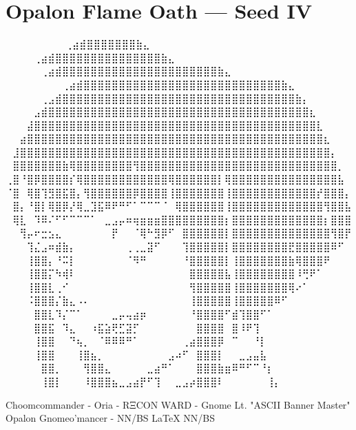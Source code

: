 \section*{Opalon Flame Oath — Seed IV}
\begin{center}
\end{center}


⠀⠀⠀⠀⠀⠀             ⠀⠀⢀⣴⣾⣿⣿⣿⣿⣿⣿⣿⣷⣄⠀⠀⠀⠀⠀⠀⠀⠀
⠀⠀⠀  ⠀      ⠀⠀⠀⠀⢀⣴⣾⣿⣿⣿⣿⣿⣿⣿⣿⣿⣿⣿⣿⣿⣿⣿⣷⣄⠀⠀⠀⠀⠀⠀⠀⠀
⠀⠀ ⠀   ⠀⠀⠀⠀⠀⢀⣴⣾⣿⣿⣿⣿⣿⣿⣿⣿⣿⣿⣿⣿⣿⣿⣿⣿⣿⣿⣿⣿⣿⣿⣷⣄⠀⠀⠀⠀⠀⠀⠀⠀
⠀⠀⠀⠀⠀⠀⠀⠀⢀⣴⣾⣿⣿⣿⣿⣿⣿⣿⣿⣿⣿⣿⣿⣿⣿⣿⣿⣿⣿⣿⣿⣿⣿⣿⣿⣿⣿⣿⣿⣷⣄⠀⠀⠀⠀⠀⠀⠀⠀
⠀⠀⠀⠀⠀⢀⣠⣾⣿⣿⣿⣿⣿⣿⣿⣿⣿⣿⣿⣿⣿⣿⣿⣿⣿⣿⣿⣿⣿⣿⣿⣿⣿⣿⣿⣿⣿⣿⣿⣿⣿⣷⡄⠀⠀⠀⠀⠀⠀
⠀⠀⠀⠀⣠⣾⣿⣿⣿⣿⣿⣿⣿⣿⣿⣿⣿⣿⣿⣿⣿⣿⣿⣿⣿⣿⣿⣿⣿⣿⣿⣿⣿⣿⣿⣿⣿⣿⣿⣿⣿⣿⣿⣆⠀⠀⠀⠀⠀
⠀⠀⠀⣼⣿⣿⣿⣿⣿⣿⣿⣿⣿⣿⣿⣿⣿⣿⣿⣿⣿⣿⣿⣿⣿⣿⣿⣿⣿⣿⣿⣿⣿⣿⣿⣿⣿⣿⣿⣿⣿⣿⣿⣿⣇⠀⠀⠀⠀
⠀⠀⣴⣿⣿⣿⣿⣿⣿⣿⣿⣿⣿⣿⣿⣿⣿⣿⣿⣿⣿⣿⣿⣿⣿⣿⣿⣿⣿⣿⣿⣿⣿⣿⣿⣿⣿⣿⣿⣿⣿⣿⣿⣿⣿⣆⠀⠀⠀
⠀⣸⣿⣿⣿⣿⣿⣿⣿⣿⣿⣿⣿⣿⣿⣿⣿⣿⣿⣿⣿⣿⣿⣿⣿⣿⣿⣿⣿⣿⣿⣿⣿⣿⣿⣿⣿⣿⣿⣿⣿⣿⣿⣿⣿⣿⡄⠀⠀
⠀⣿⣿⣿⣿⣿⣿⣿⣷⢿⣿⣿⣿⣿⣿⣿⣿⣿⢻⣿⣿⣿⣿⣿⣿⣿⣿⣿⣿⣿⣿⣿⣿⣿⣿⣿⣿⣿⣿⣿⣿⣿⣿⣿⣿⣿⣿⡀⠀
⢀⣿⠘⣿⡿⣿⣿⣿⣿⡎⢿⣿⣿⣿⣿⣿⣿⣿⣿⣿⣿⣿⣿⢿⣿⣿⣿⣿⣿⣿⡇⢿⣿⣿⣿⣿⣿⣿⣿⣿⣿⣿⣿⣿⣿⣿⣿⣧⠀
⠈⣿⠀⢿⣿⢹⣻⣿⣯⣿⡄⢻⣿⣿⣿⣿⣿⣿⡿⣿⣿⣿⣿⢸⣿⣿⣿⣿⣿⣿⣿⢸⣿⣿⣿⣿⣿⣿⣿⣿⣿⣿⣿⣿⡞⣿⣿⣿⡄
⠀⣿⡄⠘⣿⡇⢿⣿⡿⡜⢿⣀⣹⣯⠿⠟⠛⠋⠁⠉⠉⠉⠈⠀⢿⣿⣿⣿⣿⣿⣿⢸⣿⣿⣿⣿⣿⣿⣿⣿⣿⣿⣿⣿⣿⢻⣿⣿⣧
⠀⢿⣇⠀⠹⠿⠌⠋⠋⠉⠉⠉⠁⠀⣀⣠⡤⠶⢶⣶⣶⣶⣿⣿⣿⣿⣿⣿⣿⣿⣿⡆⣿⣿⣿⣿⣿⣿⣿⣿⣿⣿⣿⣿⣿⡆⣿⣿⣿
⠀⠀⢻⡤⠖⣒⣢⣄⠀⠀⠀⠀⠀⠀⠀⡟⠀⠀⠈⢿⠓⣻⡿⠋⠀⣿⣿⣿⣿⣿⣿⡇⣿⣿⣿⣿⣿⣿⣿⣿⣿⣿⣿⣿⣿⣿⢻⣿⡟
⠀⠀⠀⢹⣌⣠⠶⣾⣷⡄⠀⠀⠀⠀⠀⠀⠀⢀⢀⣀⣽⠋⠀⠀⠀⢹⣿⣿⣿⣿⣿⡇⣿⣿⣿⣿⣿⣿⣿⣿⣟⣿⣿⣿⣿⣿⠿⠋⠀
⠀⠀⠀⢸⣿⣿⡄⠘⠭⡇⠀⠀⠀⠀⠀⠀⠀⠈⠻⠛⠀⠀⠀⠀⠀⠘⣿⣿⣿⣿⣿⡇⢸⣿⣿⣿⣿⣿⣿⣿⣷⢿⣿⣿⣿⠟⠀⠀⠀
⠀⠀⠀⢸⣿⣿⡍⠳⢾⠇⠀⠀⠀⠀⠀⠀⠀⠀⠀⠀⠀⠀⠀⠀⠀⠀⣿⣿⣿⣿⣿⣧⢸⣿⣿⣿⣿⣿⣿⣿⣿⠸⢛⠟⠁⠀⠀⠀⠀
⠀⠀⠀⢸⣿⣿⣇⢀⠊⠀⠀⠀⠀⠀⠀⠀⠀⠀⠀⠀⠀⠀⠀⠀⠀⠀⢻⣿⣿⣿⣿⣿⢸⣿⣿⣿⣿⣿⣿⣿⢿⠔⠁⠀⠀⠀⠀⠀⠀
⠀⠀⠀⠨⣿⣿⣿⡌⣷⣄⠠⠄⠀⠀⠀⠀⠀⠀⠀⠀⠀⠀⠀⠀⠀⠀⢸⣿⣿⣿⣿⣿⢸⣿⣿⣿⣿⣿⠿⠋⠀⠀⠀⠀⠀⠀⠀⠀⠀
⠀⠀⠀⠀⣿⣿⣇⠹⡌⠉⠁⠀⠀⠀⠀⣀⡤⢤⣴⡶⠀⠀⠀⠀⠀⠀⠘⣿⣿⣿⣿⠋⣾⢹⣿⣿⠋⠁⠀⠀⠀⠀⠀⠀⠀⠀⠀⠀⠀
⠀⠀⠀⠀⣿⣿⣯⠀⠹⣄⠀⠀⠰⣯⣵⢟⣋⣽⡋⠀⠀⠀⠀⠀⠀⠀⠀⣿⣿⣿⣿⠀⣿⠸⠟⢹⠀⠀⠀⠀⠀⠀⠀⠀⠀⠀⠀⠀⠀
⠀⠀⠀⠀⢸⣿⣿⠀⠀⠙⢦⡀⠀⠈⠿⠿⠿⠛⠁⠀⠀⠀⠀⠀⠀⢀⣴⣿⣿⣿⡿⠀⠉⠀⠀⠘⡇⠀⠀⠀⠀⠀⠀⠀⠀⠀⠀⠀⠀
⠀⠀⠀⠀⢸⣿⣿⠀⠀⠀⢸⣿⣦⡀⠀⠀⠀⠀⠀⠀⠀⠀⠀⣠⠴⠋⠀⣿⣿⣿⡇⠀⠀⣀⣠⣤⣧⠀⠀⠀⠀⠀⠀⠀⠀⠀⠀⠀⠀
⠀⠀⠀⠀⠀⣿⣿⡀⠀⠀⠀⢻⣿⣿⣄⠀⠀⠀⠀⠀⣀⣴⠛⠁⠀⠀⠀⣿⣿⣿⣷⣶⠿⠛⠋⠉⠘⡆⠀⠀⠀⠀⠀⠀⠀⠀⠀⠀⠀
⠀⠀⠀⠀⠀⢸⣿⡇⠀⠀⠀⠸⣿⣿⣿⣦⣀⣠⣴⡟⠋⢹⠀⠀⣀⣠⡴⣿⣿⣿⠇⠀⠀⠀⠀⠀⠀⢸⡄⠀⠀⠀⠀⠀⠀⠀⠀⠀⠀

Choomcommander - Oria - RΞCON WARD - Gnome Lt. "ASCII Banner Master"
             Opalon Gnomeo'mancer - NN/BS LaTeX{} NN/BS

